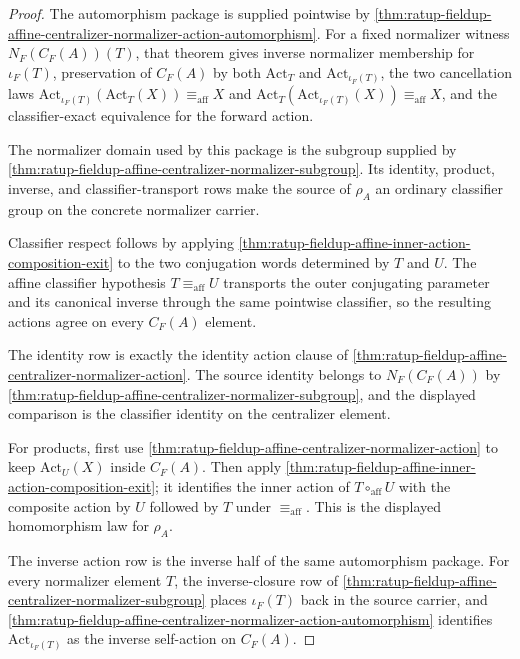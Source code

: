 \begin{proof}
The automorphism package is supplied pointwise by
\autoref{thm:ratup-fieldup-affine-centralizer-normalizer-action-automorphism}.
For a fixed normalizer witness $N_F(C_F(A))(T)$, that theorem gives inverse
normalizer membership for $\iota_F(T)$, preservation of $C_F(A)$ by both
$\mathrm{Act}_T$ and $\mathrm{Act}_{\iota_F(T)}$, the two cancellation laws
$\mathrm{Act}_{\iota_F(T)}(\mathrm{Act}_T(X))\equiv_{\mathrm{aff}}X$ and
$\mathrm{Act}_T(\mathrm{Act}_{\iota_F(T)}(X))\equiv_{\mathrm{aff}}X$, and the
classifier-exact equivalence for the forward action.

The normalizer domain used by this package is the subgroup supplied by
\autoref{thm:ratup-fieldup-affine-centralizer-normalizer-subgroup}. Its identity,
product, inverse, and classifier-transport rows make the source of $\rho_A$ an
ordinary classifier group on the concrete normalizer carrier.

Classifier respect follows by applying
\autoref{thm:ratup-fieldup-affine-inner-action-composition-exit} to the two
conjugation words determined by $T$ and $U$. The affine classifier hypothesis
$T\equiv_{\mathrm{aff}}U$ transports the outer conjugating parameter and its
canonical inverse through the same pointwise classifier, so the resulting
actions agree on every $C_F(A)$ element.

The identity row is exactly the identity action clause of
\autoref{thm:ratup-fieldup-affine-centralizer-normalizer-action}. The source
identity belongs to $N_F(C_F(A))$ by
\autoref{thm:ratup-fieldup-affine-centralizer-normalizer-subgroup}, and the
displayed comparison is the classifier identity on the centralizer element.

For products, first use
\autoref{thm:ratup-fieldup-affine-centralizer-normalizer-action} to keep
$\mathrm{Act}_U(X)$ inside $C_F(A)$. Then apply
\autoref{thm:ratup-fieldup-affine-inner-action-composition-exit}; it identifies
the inner action of $T\circ_{\mathrm{aff}}U$ with the composite action by $U$
followed by $T$ under $\equiv_{\mathrm{aff}}$. This is the displayed homomorphism
law for $\rho_A$.

The inverse action row is the inverse half of the same automorphism package.
For every normalizer element $T$, the inverse-closure row of
\autoref{thm:ratup-fieldup-affine-centralizer-normalizer-subgroup} places
$\iota_F(T)$ back in the source carrier, and
\autoref{thm:ratup-fieldup-affine-centralizer-normalizer-action-automorphism}
identifies $\mathrm{Act}_{\iota_F(T)}$ as the inverse self-action on $C_F(A)$.
\end{proof}

